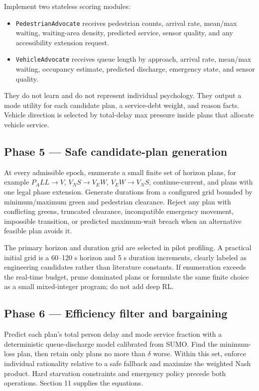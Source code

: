 \documentclass[
  english,
  11pt,
  a4paper,
]{article}
\providecommand{\tightlist}{%
  \setlength{\itemsep}{0pt}\setlength{\parskip}{0pt}}
\begin{document}
Implement two stateless scoring modules:

\begin{itemize}
\tightlist
\item
  \texttt{PedestrianAdvocate} receives pedestrian counts, arrival rate,
  mean/max waiting, waiting-area density, predicted service, sensor
  quality, and any accessibility extension request.
\item
  \texttt{VehicleAdvocate} receives queue length by approach, arrival
  rate, mean/max waiting, occupancy estimate, predicted discharge,
  emergency state, and sensor quality.
\end{itemize}

They do not learn and do not represent individual psychology. They
output a mode utility for each candidate plan, a service-debt weight,
and reason facts. Vehicle direction is selected by total-delay max
pressure inside plans that allocate vehicle service.

\subsection{Phase 5 --- Safe candidate-plan
generation}\label{phase-5-safe-candidate-plan-generation}

At every admissible epoch, enumerate a small finite set of horizon
plans, for example \(P_ALL\rightarrow{}V\), \(V_NS\rightarrow{}V_EW\), \(V_EW\rightarrow{}V_NS\),
continue-current, and plans with one legal phase extension. Generate
durations from a configured grid bounded by minimum/maximum green and
pedestrian clearance. Reject any plan with conflicting greens, truncated
clearance, incompatible emergency movement, impossible transition, or
predicted maximum-wait breach when an alternative feasible plan avoids
it.

The primary horizon and duration grid are selected in pilot profiling. A
practical initial grid is a 60--120 s horizon and 5 s duration
increments, clearly labeled as engineering candidates rather than
literature constants. If enumeration exceeds the real-time budget, prune
dominated plans or formulate the same finite choice as a small
mixed-integer program; do not add deep RL.

\subsection{Phase 6 --- Efficiency filter and
bargaining}\label{phase-6-efficiency-filter-and-bargaining}

Predict each plan's total person delay and mode service fraction with a
deterministic queue-discharge model calibrated from SUMO. Find the
minimum-loss plan, then retain only plans no more than \(\delta\) worse.
Within this set, enforce individual rationality relative to a safe
fallback and maximize the weighted Nash product. Hard starvation
constraints and emergency policy precede both operations. Section 11
supplies the equations.
\end{document}
